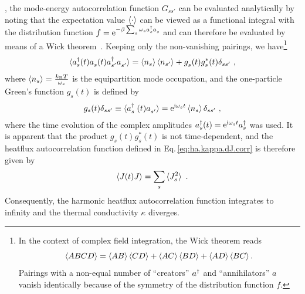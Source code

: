 , the mode-energy autocorrelation function $G_{ss'}$ can be evaluated analytically by noting that the expectation value $\braket{\cdot}$ can be viewed as a functional integral with the distribution function $f = {\rm e}^{-\beta \sum_s \omega_s \D a_{s} \fD a_{s}}$ and can therefore be evaluated by means of a Wick theorem~\cite{Isaeva2019}.
Keeping only the non-vanishing pairings, we have\footnote{In the context of complex field integration, the Wick theorem reads~\cite{NegeleOrland} $$\braket{ABCD} = \braket{AB}\braket{CD} + \braket{AC}\braket{BD} + \braket{AD}\braket{BC}.$$ Pairings with a non-equal number of ``creators'' ${a}^\dagger$ and ``annihilators'' $a$ vanish identically because of the symmetry of the distribution function $f$.}
\begin{align}
	\braket{\D a_s (t) \fD{a}_s (t) \D a_{s'} \fD a_{s'}}
		= \braket{n_s} \braket{n_{s'}} + \fD g_s (t) g^\ast_{s} (t) \delta_{ss'}~,
	\label{eq:ha.kappa.wick}
\end{align}
where $\braket{n_s} = \frac{k_{\rm B} T}{\omega_s}$
is the equipartition mode occupation, and the one-particle Green's function $g_s (t)$ is defined by
\begin{align}
	g_s (t) \delta_{ss'}
		\equiv \braket{\D{a}_{\fP s} (t) \fD{a}_{s'}} 
		= {\rm e}^{\im \omega_s t} \braket{n_s} \delta_{ss'}~,
\end{align}
where the time evolution of the complex amplitudes $a^{\dagger}_s (t) = {\rm e}^{{\rm i} \omega_s t} {a}^\dagger_s$ was used.
It is apparent that the product $g_s(t) g^\ast_s(t)$ is not time-dependent, and the heatflux autocorrelation function defined in Eq.\,\eqref{eq:ha.kappa.dJ.corr} is therefore given by
\begin{align}
	\braket{J (t) J} = \sum_s \braket{J_s^2}~.
	\label{eq:ha.kappa.JJ}
\end{align}
Consequently, the harmonic heatflux autocorrelation function integrates to infinity and the thermal conductivity $\kappa$ diverges.

